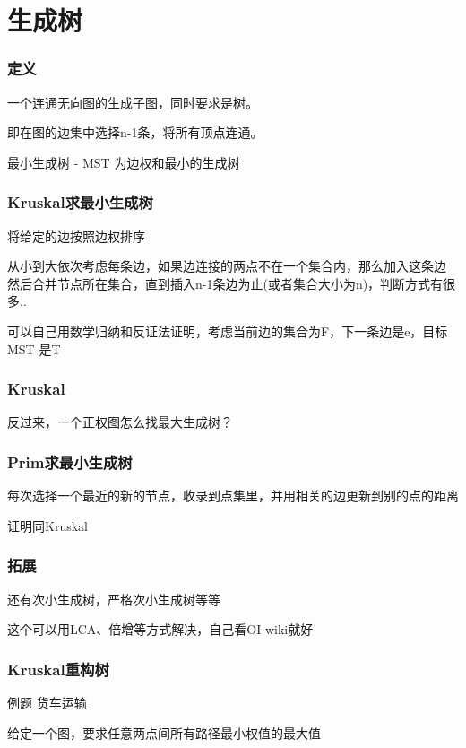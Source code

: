 \documentclass{beamer}
\begin{document}
  \section{生成树}

  \begin{frame}
    \frametitle{定义}
    一个连通无向图的生成子图，同时要求是树。

    即在图的边集中选择n-1条，将所有顶点连通。

    \vspace*{1\baselineskip}

    最小生成树 - MST 为边权和最小的生成树
  \end{frame}

  \begin{frame}
    \frametitle{Kruskal求最小生成树}
    将给定的边按照边权排序

    \vspace*{1\baselineskip}
    
    从小到大依次考虑每条边，如果边连接的两点不在一个集合内，那么加入这条边
    然后合并节点所在集合，直到插入n-1条边为止(或者集合大小为n)，判断方式有很多..

    \vspace*{1\baselineskip}

    可以自己用数学归纳和反证法证明，考虑当前边的集合为F，下一条边是e，目标MST
    是T
  \end{frame}

  \begin{frame}
    \frametitle{Kruskal}
    反过来，一个正权图怎么找最大生成树？
  \end{frame}

  \begin{frame}
    \frametitle{Prim求最小生成树}
    每次选择一个最近的新的节点，收录到点集里，并用相关的边更新到别的点的距离

    证明同Kruskal
  \end{frame}

  \begin{frame}
    \frametitle{拓展}
    还有次小生成树，严格次小生成树等等

    \vspace*{1\baselineskip}

    这个可以用LCA、倍增等方式解决，自己看OI-wiki就好
  \end{frame}

  \begin{frame}
    \frametitle{Kruskal重构树}
    例题 \href{https://www.luogu.com.cn/problem/P1967}{货车运输}
    
    \vspace*{1\baselineskip}
    
    给定一个图，要求任意两点间所有路径最小权值的最大值
  \end{frame}
\end{document}
